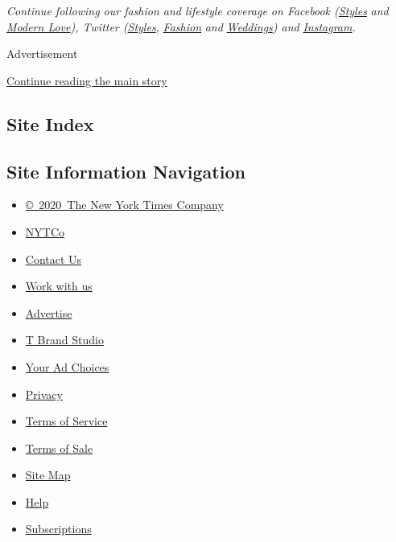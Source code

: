 \emph{Continue following our fashion and lifestyle coverage on Facebook
(}\href{https://www.facebook.com/nytimesstyles}{\emph{Styles}}
\emph{and} \href{https://www.facebook.com/modernlove}{\emph{Modern
Love}}\emph{), Twitter
(}\href{https://twitter.com/nytstyles}{\emph{Styles}}\emph{,}
\href{https://twitter.com/nytfashion}{\emph{Fashion}} \emph{and}
\href{https://twitter.com/nytimesvows}{\emph{Weddings}}\emph{) and}
\href{https://instagram.com/nytimesfashion}{\emph{Instagram}}\emph{.}

Advertisement

\protect\hyperlink{after-bottom}{Continue reading the main story}

\hypertarget{site-index}{%
\subsection{Site Index}\label{site-index}}

\hypertarget{site-information-navigation}{%
\subsection{Site Information
Navigation}\label{site-information-navigation}}

\begin{itemize}
\tightlist
\item
  \href{https://help.nytimes.com/hc/en-us/articles/115014792127-Copyright-notice}{©~2020~The
  New York Times Company}
\end{itemize}

\begin{itemize}
\tightlist
\item
  \href{https://www.nytco.com/}{NYTCo}
\item
  \href{https://help.nytimes.com/hc/en-us/articles/115015385887-Contact-Us}{Contact
  Us}
\item
  \href{https://www.nytco.com/careers/}{Work with us}
\item
  \href{https://nytmediakit.com/}{Advertise}
\item
  \href{http://www.tbrandstudio.com/}{T Brand Studio}
\item
  \href{https://www.nytimes.com/privacy/cookie-policy\#how-do-i-manage-trackers}{Your
  Ad Choices}
\item
  \href{https://www.nytimes.com/privacy}{Privacy}
\item
  \href{https://help.nytimes.com/hc/en-us/articles/115014893428-Terms-of-service}{Terms
  of Service}
\item
  \href{https://help.nytimes.com/hc/en-us/articles/115014893968-Terms-of-sale}{Terms
  of Sale}
\item
  \href{https://spiderbites.nytimes.com}{Site Map}
\item
  \href{https://help.nytimes.com/hc/en-us}{Help}
\item
  \href{https://www.nytimes.com/subscription?campaignId=37WXW}{Subscriptions}
\end{itemize}
